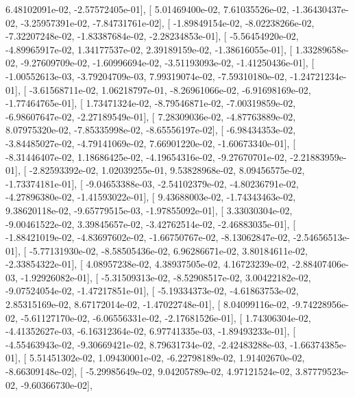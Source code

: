 \documentclass{article}
\begin{document}
          6.48102091e-02,  -2.57572405e-01],
       [  5.01469400e-02,   7.61035526e-02,  -1.36430437e-02,
         -3.25957391e-02,  -7.84731761e-02],
       [ -1.89849154e-02,  -8.02238266e-02,  -7.32207248e-02,
         -1.83387684e-02,  -2.28234853e-01],
       [ -5.56454920e-02,  -4.89965917e-02,   1.34177537e-02,
          2.39189159e-02,  -1.38616055e-01],
       [  1.33289658e-02,  -9.27609709e-02,  -1.60996694e-02,
         -3.51193093e-02,  -1.41250436e-01],
       [ -1.00552613e-03,  -3.79204709e-03,   7.99319074e-02,
         -7.59310180e-02,  -1.24721234e-01],
       [ -3.61568711e-02,   1.06218797e-01,  -8.26961066e-02,
         -6.91698169e-02,  -1.77464765e-01],
       [  1.73471324e-02,  -8.79546871e-02,  -7.00319859e-02,
         -6.98607647e-02,  -2.27189549e-01],
       [  7.28309036e-02,  -4.87763889e-02,   8.07975320e-02,
         -7.85335998e-02,  -8.65556197e-02],
       [ -6.98434353e-02,  -3.84485027e-02,  -4.79141069e-02,
          7.66901220e-02,  -1.60673340e-01],
       [ -8.31446407e-02,   1.18686425e-02,  -4.19654316e-02,
         -9.27670701e-02,  -2.21883959e-01],
       [ -2.82593392e-02,   1.02039255e-01,   9.53828968e-02,
          8.09456575e-02,  -1.73374181e-01],
       [ -9.04653388e-03,  -2.54102379e-02,  -4.80236791e-02,
         -4.27896380e-02,  -1.41593022e-01],
       [  9.43688003e-02,  -1.74343463e-02,   9.38620118e-02,
         -9.65779515e-03,  -1.97855092e-01],
       [  3.33030304e-02,  -9.00461522e-02,   3.39845657e-02,
         -3.42762514e-02,  -2.46883035e-01],
       [ -1.88421019e-02,  -4.83697602e-02,  -1.66750767e-02,
         -8.13062847e-02,  -2.54656513e-01],
       [ -5.77131930e-02,  -8.58505436e-02,   6.96286671e-02,
          3.80184611e-02,  -2.33854322e-01],
       [  4.08957238e-02,   4.38937505e-02,   4.16723239e-02,
         -2.88407406e-03,  -1.92926082e-01],
       [ -5.31509313e-02,  -8.52908517e-02,   3.00422182e-02,
         -9.07524054e-02,  -1.47217851e-01],
       [ -5.19334373e-02,  -4.61863753e-02,   2.85315169e-02,
          8.67172014e-02,  -1.47022748e-01],
       [  8.04099116e-02,  -9.74228956e-02,  -5.61127170e-02,
         -6.06556331e-02,  -2.17681526e-01],
       [  1.74306304e-02,  -4.41352627e-03,  -6.16312364e-02,
          6.97741335e-03,  -1.89493233e-01],
       [ -4.55463943e-02,  -9.30669421e-02,   8.79631734e-02,
         -2.42483288e-03,  -1.66374385e-01],
       [  5.51451302e-02,   1.09430001e-02,  -6.22798189e-02,
          1.91402670e-02,  -8.66309148e-02],
       [ -5.29985649e-02,   9.04205789e-02,   4.97121524e-02,
          3.87779523e-02,  -9.60366730e-02],
\end{document}
